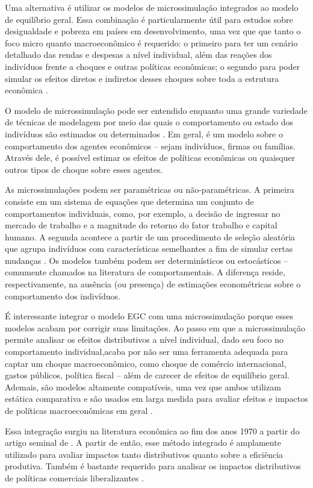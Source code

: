 Uma alternativa é utilizar os modelos de microssimulação integrados ao modelo de equilíbrio geral. Essa combinação é particularmente útil para estudos sobre desigualdade e pobreza em países em desenvolvimento, uma vez que que tanto o foco micro quanto macroeconômico é requerido: o primeiro para ter um cenário detalhado das rendas e despesas a nível individual, além das reações dos indivíduos frente a choques e outras políticas econômicas; o segundo para poder simular os efeitos diretos e indiretos desses choques sobre toda a estrutura econômica \cite{tiberti17, klevmarken22}.

O modelo de microssimulação pode ser entendido enquanto uma grande variedade de técnicas de modelagem por meio das quais o comportamento ou estado dos indivíduos são estimados ou determinados \cite{figari15}. Em geral, é um modelo sobre o comportamento dos agentes econômicos -- sejam indivíduos, firmas ou famílias. Através dele, é possível estimar os efeitos de políticas econômicas ou quaisquer outros tipos de choque sobre esses agentes.

As microssimulações podem ser paramétricas ou não-paramétricas. A primeira consiste em um sistema de equações que determina um conjunto de comportamentos individuais, como, por exemplo, a decisão de ingressar no mercado de trabalho e a magnitude do retorno do fator trabalho e capital humano. A segunda acontece a partir de um procedimento de seleção aleatória que agrupa indivíduos com características semelhantes a fim de simular certas mudanças \cite{tiberti17m}. Os modelos também podem ser determinísticos ou estocásticos -- comumente chamados na literatura de comportamentais. A diferença reside, respectivamente, na ausência (ou presença) de estimações econométricas sobre o comportamento dos indivíduos.

É interessante integrar o modelo EGC com uma microssimulação porque esses modelos acabam por corrigir suas limitações. Ao passo em que a microssimulação permite analisar os efeitos distributivos a nível individual, dado seu foco no comportamento individual,acaba por não ser uma ferramenta adequada para captar um choque macroeconômico, como choque de comércio internacional, gastos públicos, política fiscal -- além de carecer de efeitos de equilíbrio geral. Ademais, são modelos altamente compatíveis, uma vez que ambos utilizam estática comparativa e são usados em larga medida para avaliar efeitos e impactos de políticas macroeconômicas em geral \cite{tiberti17m}.

Essa integração surgiu na literatura econômica ao fim dos anos 1970 a partir do artigo seminal de \textcite{adelman78}. A partir de então, esse método integrado é amplamente utilizado para avaliar impactos tanto distributivos quanto sobre a eficiência produtiva. Também é bastante requerido para analisar os impactos distributivos de políticas comerciais liberalizantes \cite{carneiro06, ferreira06, raihan10, cicowiez16, mbanda21}.

